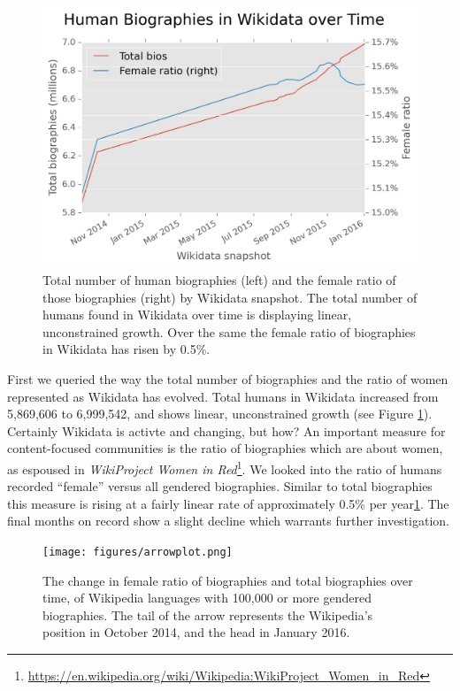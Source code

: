 \documentclass{sig-alternate-05-2015}
\begin{document}
\begin{figure}
\includegraphics[width=\columnwidth]{figures/totalfrb.png} 
\caption{Total number of human biographies (left) and the female ratio of those biographies (right) by Wikidata snapshot. The total number of humans found in Wikidata over time is displaying linear, unconstrained growth. Over the same  the female ratio of biographies in Wikidata has risen by 0.5\%.}
\label{fig:totalfrb}
\end{figure}

First we queried the way the total number of biographies and the ratio of women represented as Wikidata has evolved. Total humans in Wikidata increased from 5,869,606 to 6,999,542, and shows linear, unconstrained growth (see Figure \ref{fig:totalfrb}). Certainly Wikidata is activte and changing, but how? An important measure for content-focused communities is the ratio of biographies which are about women, as espoused in \textit{WikiProject Women in Red}\footnote{\url{https://en.wikipedia.org/wiki/Wikipedia:WikiProject_Women_in_Red}}. We looked into the ratio of  humans recorded ``female'' versus all gendered biographies. Similar to total biographies this measure is rising at a fairly linear rate of approximately 0.5\% per year\ref{fig:totalfrb}. The final months on record show a slight decline which warrants further investigation. 


\begin{figure}
\texttt{[image: figures/arrowplot.png]} 
\caption{The change in female ratio of biographies and total biographies over time, of Wikipedia languages with 100,000 or more gendered biographies. The tail of the arrow represents the Wikipedia's position in October 2014, and the head in January 2016.}
\label{fig:changefrb}
\end{figure}
\end{document}
